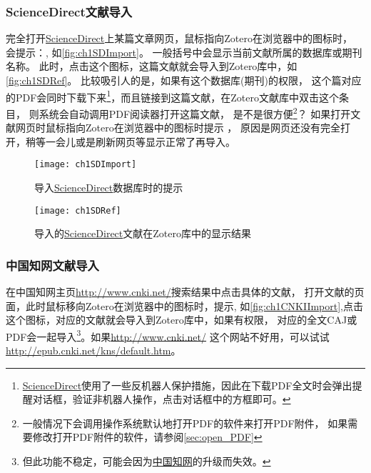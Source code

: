 \documentclass[theorem=false,mathfont=none,openany,sub3section]{easybook}
\begin{document}
\subsubsection{ScienceDirect文献导入}
完全打开\href{https://www.sciencedirect.com/}{ScienceDirect}上某篇文章网页，鼠标指向Zotero在浏览器中的图标时，
会提示：, 如\autoref{fig:ch1SDImport}。
一般括号中会显示当前文献所属的数据库或期刊名称。
此时，点击这个图标，这篇文献就会导入到Zotero库中，如\autoref{fig:ch1SDRef}。
比较吸引人的是，如果有这个数据库(期刊)的权限，
这个篇对应的PDF会同时下载下来\footnote{\href{https://www.sciencedirect.com/}{ScienceDirect}使用了一些反机器人保护措施，因此在下载PDF全文时会弹出提醒对话框，验证非机器人操作，点击对话框中的方框即可。}，而且链接到这篇文献，在Zotero文献库中双击这个条目，
则系统会自动调用PDF阅读器打开这篇文献，
是不是很方便\footnote{一般情况下会调用操作系统默认地打开PDF的软件来打开PDF附件，
	如果需要修改打开PDF附件的软件，请参阅\cref{sec:open_PDF}}？
如果打开文献网页时鼠标指向Zotero在浏览器中的图标时提示
，
原因是网页还没有完全打开，稍等一会儿或是刷新网页等显示正常了再导入。
\begin{figure}[htbp]
	\centering
	\texttt{[image: ch1SDImport]}
	\caption{导入\href{https://www.sciencedirect.com/}{ScienceDirect}数据库时的提示}
	\label{fig:ch1SDImport}
\end{figure}
\begin{figure}
	\centering
	\texttt{[image: ch1SDRef]}
	\caption{导入的\href{https://www.sciencedirect.com/}{ScienceDirect}文献在Zotero库中的显示结果}
	\label{fig:ch1SDRef}
\end{figure}
\subsubsection{中国知网文献导入} \label{sec:cnki}
在中国知网主页\url{http://www.cnki.net/}搜索结果中点击具体的文献，
打开文献的页面，此时鼠标移向Zotero在浏览器中的图标时，提示,
如\autoref{fig:ch1CNKIImport},点击这个图标，对应的文献就会导入到Zotero库中，如果有权限，
对应的全文CAJ或PDF会一起导入\footnote{但此功能不稳定，可能会因为\href{www.cnki.net}{中国知网}的升级而失效。}。如果\url{http://www.cnki.net/}
这个网站不好用，可以试试\url{http://epub.cnki.net/kns/default.htm}。
\end{document}
